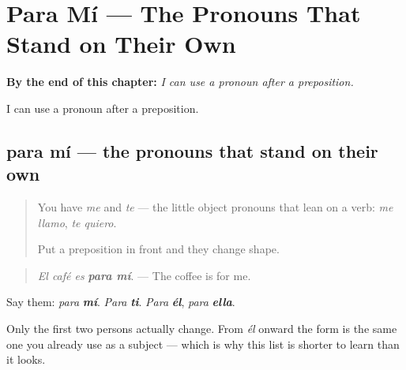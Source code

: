 
\chapter{Para Mí --- The Pronouns That Stand on Their Own}
\label{ch:para-mi}

\begin{chapteropening}
\textbf{By the end of this chapter:} \emph{I can use a pronoun after a preposition.}

I can use a pronoun after a preposition.
\end{chapteropening}

\section[para mí]{para mí — the pronouns that stand on their own}

\label{lesson:ES-C64-para-mi}



\begin{quote}
You have \emph{me} and \emph{te} — the little object pronouns that lean on a verb: \emph{me llamo}, \emph{te quiero}.

Put a preposition in front and they change shape.
\end{quote}

\begin{grammarlens}[title={Grammar Lens: after a preposition}]
\begin{quote}
\emph{El café es} \emph{\textbf{para mí}}. — The coffee is for me.
\end{quote}

Say them: \emph{para} \emph{\textbf{mí}}. \emph{Para} \emph{\textbf{ti}}. \emph{Para} \emph{\textbf{él}}, \emph{para} \emph{\textbf{ella}}.

Only the first two persons actually change. From \emph{él} onward the form is the same one you already use as a subject — which is why this list is shorter to learn than it looks.
\end{grammarlens}

